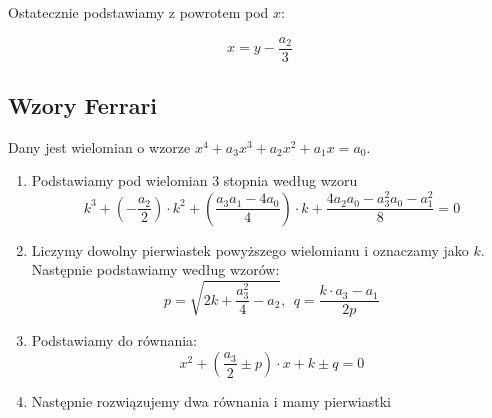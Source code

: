 Ostatecznie podstawiamy z powrotem pod $x$:

\begin{equation*}
    x = y - \frac{a_2}{3}
\end{equation*}


\subsection*{Wzory Ferrari}

Dany jest wielomian o wzorze $x^4 + a_3x^3 + a_2x^2 + a_1x = a_0$.

\begin{enumerate}
    \item Podstawiamy pod wielomian 3 stopnia według wzoru
    \begin{equation*}
        k^3 + \left(-\frac{a_2}{2}\right)\cdot k^2 +
        \left(\frac{a_3 a_1 - 4a_0}{4}\right)\cdot k +
        \frac{4a_2a_0 - a_3^2 a_0 - a_1^2}{8} = 0
    \end{equation*}
    \item Liczymy dowolny pierwiastek powyższego wielomianu i oznaczamy jako $k$. Następnie podstawiamy według wzorów:
    \begin{equation*}
        p = \sqrt{2k + \frac{a_3^2}{4} - a_2},\ \ q = \frac{k\cdot a_3 - a_1}{2p}
    \end{equation*}
    \item Podstawiamy do równania:
    \begin{equation*}
        x^2 + \left(\frac{a_3}{2} \pm p\right)\cdot x + k \pm q = 0
    \end{equation*}
    \item Następnie rozwiązujemy dwa równania i mamy pierwiastki
\end{enumerate}